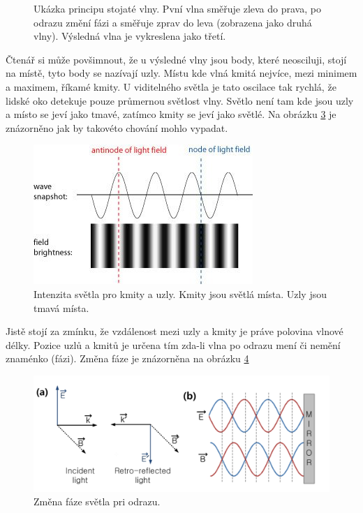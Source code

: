 \documentclass[12pt,a4paper,titlepage,final]{report}
\begin{document}
\begin{figure}[!h]
\begin{subfigure}[b]{0.23\textwidth}
                \caption{}
                \label{fig:standing_wave:frame_4}
        \end{subfigure}
        \caption{Ukázka principu stojaté vlny. Pvní vlna směřuje zleva do prava, po odrazu změní fázi a směřuje zprav do leva (zobrazena jako druhá vlny). Výsledná vlna je vykreslena jako třetí.}\label{fig:standing_wave}
\end{figure}

Čtenář si může povšimnout, že u výsledné vlny jsou body, které neosciluji, stojí na místě, tyto body se nazívají uzly. Místu
kde vlná kmitá nejvíce, mezi minimem a maximem, říkamé kmity.
U viditelného světla je tato oscilace tak rychlá, že lidské oko
detekuje pouze průmernou světlost vlny. Světlo není tam kde jsou uzly a místo se jeví jako tmavé, zatímco kmity se jeví jako světlé.
Na obrázku \ref{fig:intensityvsamplitude} je znázorněno jak by takovéto chování mohlo vypadat.

\begin{figure}[!htb]
   \centering
 	\includegraphics{intensityvsamplitude}
   \caption{Intenzita světla pro kmity a uzly. Kmity jsou světlá místa. Uzly jsou tmavá místa.}
   \label{fig:intensityvsamplitude}
\end{figure}

Jistě stojí za zmínku, že vzdálenost mezi uzly a kmity je 
práve polovina vlnové délky. Pozice uzlů a kmitů je určena tím
zda-li vlna po odrazu mení či nemění znaménko (fázi). Změna fáze je 
znázorněna na obrázku \ref{fig:eh_reflection}

\begin{figure}[!htb]
   \centering
 	\includegraphics[width=\textwidth]{eh_reflection}
   \caption{Změna fáze světla pri odrazu.}
   \label{fig:eh_reflection}
\end{figure}
\end{document}

